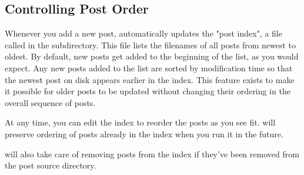\documentclass[11pt, letterpaper, oneside, titlepage]{book}
\begin{document}
\subsection{Controlling Post Order}
\label{sec:postsindex}

Whenever you add a new post,  automatically updates the "post
index", a file called  in the 
subdirectory.  This file lists the filenames of all posts from newest
to oldest.  By default, new posts get added to the beginning of the
list, as you would expect.  Any new posts added to the list are sorted
by modification time so that the newest post on disk appears earlier
in the index.  This feature exists to make it possible for older posts
to be updated without changing their ordering in the overall sequence
of posts.

At any time, you can edit the index to reorder the posts as you see
fit.   will preserve ordering of posts already in the index
when you run it in the future.

 will also take care of removing posts from the index if
they've been removed from the post source directory.
\end{document}
